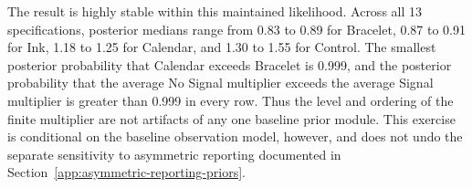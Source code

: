 \documentclass[12pt]{article}
\begin{document}

The result is highly stable within this maintained likelihood.  Across all 13
specifications, posterior medians range from 0.83 to 0.89 for Bracelet, 0.87
to 0.91 for Ink, 1.18 to 1.25 for Calendar, and 1.30 to 1.55 for Control.  The
smallest posterior probability that Calendar exceeds Bracelet is 0.999, and
the posterior probability that the average No Signal multiplier exceeds the
average Signal multiplier is greater than 0.999 in every row.  Thus the level
and ordering of the finite multiplier are not artifacts of any one baseline
prior module.  This exercise is conditional on the baseline observation
model, however, and does not undo the separate sensitivity to asymmetric
reporting documented in Section~\ref{app:asymmetric-reporting-priors}.
\end{document}
